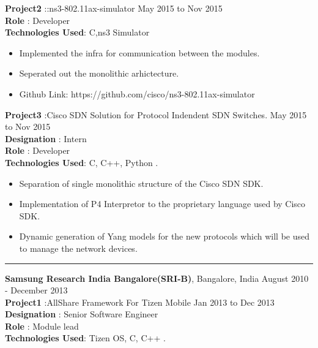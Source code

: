 \documentclass{resumeclass}
\begin{document}
\begin{resume}
\textbf{Project2} ::ns3-802.11ax-simulator \hfill      May 2015 to Nov 2015 \\

\textbf{Role} : Developer \\
\textbf{Technologies Used}: C,ns3 Simulator

 \begin{itemize} \itemsep -2pt
  \item Implemented the infra for communication between the modules.
  \item Seperated out the monolithic arhictecture.
  \item Github Link: https://github.com/cisco/ns3-802.11ax-simulator
\end{itemize} \vspace{-6pt}

\textbf{Project3} :Cisco SDN Solution for Protocol Indendent SDN Switches. \hfill      May 2015 to Nov 2015 \\
\textbf{Designation} : Intern \\
\textbf{Role} : Developer \\
\textbf{Technologies Used}: C, C++, Python .

 \begin{itemize} \itemsep -2pt
  \item  Separation of single monolithic structure of the Cisco SDN SDK.
  \item Implementation of P4 Interpretor to the proprietary language used by Cisco SDK.
  \item Dynamic generation of Yang models for the new protocols which will be used to manage the network devices.
\end{itemize} \vspace{-6pt}

\hfill   
\noindent\rule{20cm}{0.4pt}

{\large \textbf{Samsung Research India Bangalore(SRI-B)}, Bangalore, India} \hfill        August 2010 - December 2013 \\[0.5pt]

\textbf{Project1} :AllShare Framework For Tizen Mobile \hfill      Jan 2013 to Dec 2013 \\
\textbf{Designation} : Senior Software Engineer \\
\textbf{Role} : Module lead \\
\textbf{Technologies Used}: Tizen OS, C, C++ .


\end{resume}
\end{document}
